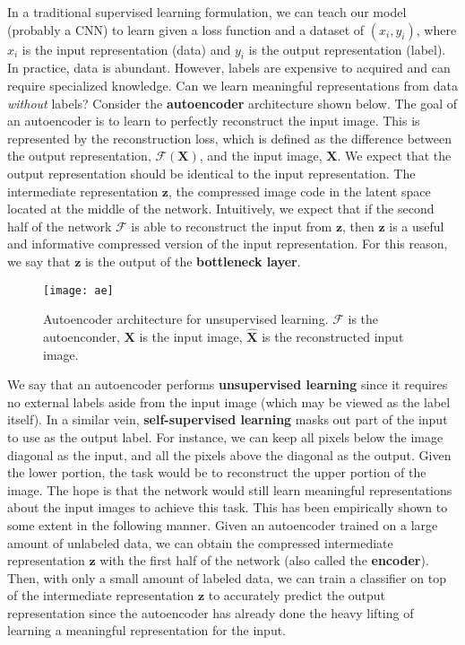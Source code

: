 \documentclass[12pt]{article}
\begin{document}
In a traditional supervised learning formulation, we can teach our model (probably a CNN) to learn given a loss function and a dataset of $(x_{i}, y_{i})$, where $x_{i}$ is the input representation (data) and $y_{i}$ is the output representation (label). In practice, data is abundant. However, labels are expensive to acquired and can require specialized knowledge. Can we learn meaningful representations from data \textit{without} labels? Consider the \textbf{autoencoder} architecture shown below. The goal of an autoencoder is to learn to perfectly reconstruct the input image. This is represented by the reconstruction loss, which is defined as the difference between the output representation, $\mathcal{F}(\mathbf{X})$, and the input image, $ \mathbf{X}$. We expect that the output representation should be identical to the input representation. The intermediate representation $ \mathbf{z}$, the compressed image code in the latent space located at the middle of the network. Intuitively, we expect that if the second half of the network $\mathcal{F}$ is able to reconstruct the input from  $ \mathbf{z}$, then $ \mathbf{z}$ is a useful and informative compressed version of the input representation. For this reason, we say that $ \mathbf{z}$ is the output of the \textbf{bottleneck layer}.

\begin{figure}[H]
  \caption{Autoencoder architecture for unsupervised learning. $\mathcal{F}$ is the autoenconder, $ \mathbf{X}$ is the input image, $\mathbf{\hat{X}}$ is the reconstructed input image.}
  \centering
\texttt{[image: ae]}
\end{figure}

We say that an autoencoder performs \textbf{unsupervised learning} since it requires no external labels aside from the input image (which may be viewed as the label itself). In a similar vein, \textbf{self-supervised learning} masks out part of the input to use as the output label. For instance, we can keep all pixels below the image diagonal as the input, and all the pixels above the diagonal as the output. Given the lower portion, the task would be to reconstruct the upper portion of the image. The hope is that the network would still learn meaningful representations about the input images to achieve this task. This has been empirically shown to some extent in the following manner. Given an autoencoder trained on a large amount of unlabeled data, we can obtain the compressed intermediate representation $ \mathbf{z}$ with the first half of the network (also called the \textbf{encoder}). Then, with only a small amount of labeled data, we can train a classifier on top of the intermediate representation $ \mathbf{z}$ to accurately predict the output representation since the autoencoder has already done the heavy lifting of learning a meaningful representation for the input.
\end{document}
